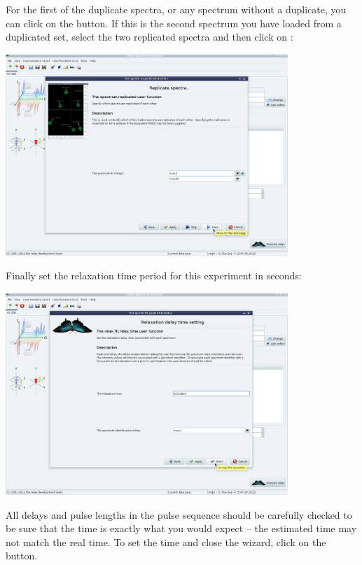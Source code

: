 For the first of the duplicate spectra, or any spectrum without a duplicate, you can click on the  button.  If this is the second spectrum you have loaded from a duplicated set, select the two replicated spectra and then click on :

\begin{minipage}[h]{\linewidth}
\centerline{\includegraphics[width=0.8\textwidth, bb=14 14 1415 1019]{graphics/screenshots/r1_analysis/peak_intensity_replicates2}}
\end{minipage}

Finally set the relaxation time period for this experiment in seconds:

\begin{minipage}[h]{\linewidth}
\centerline{\includegraphics[width=0.8\textwidth, bb=14 14 1415 1019]{graphics/screenshots/r1_analysis/peak_intensity_times}}
\end{minipage}

All delays and pulse lengths in the pulse sequence should be carefully checked to be sure that the time is exactly what you would expect -- the estimated time may not match the real time.  To set the time and close the wizard, click on the  button.

